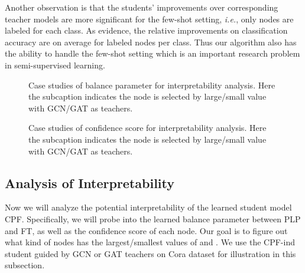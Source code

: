 \documentclass[sigconf]{acmart}
\begin{document}
Another observation is that the students' improvements over corresponding teacher models are more significant for the few-shot setting, \textit{i.e.}, only  nodes are labeled for each class. As evidence, the relative improvements on classification accuracy are  on average for  labeled nodes per class. Thus our algorithm also has the ability to handle the few-shot setting which is an important research problem in semi-supervised learning.

\begin{figure*}[ht]
\begin{minipage}[b]{\linewidth}
    \centering
\end{minipage}
\caption{Case studies of balance parameter  for interpretability analysis. Here the subcaption indicates the node is selected by large/small  value with GCN/GAT as teachers.}
\label{fig:alpha}
\end{figure*}
\begin{figure*}[ht]
\begin{minipage}[b]{\linewidth}
    \centering
\end{minipage} \caption{Case studies of confidence score  for interpretability analysis. Here the subcaption indicates the node is selected by large/small  value with GCN/GAT as teachers.}
\label{fig:confidence}
\end{figure*}
\subsection{Analysis of Interpretability}
Now we will analyze the potential interpretability of the learned student model CPF. Specifically, we will probe into the learned balance parameter  between PLP and FT, as well as the confidence score  of each node. Our goal is to figure out what kind of nodes has the largest/smallest values of  and . We use the CPF-ind student guided by GCN or GAT teachers on Cora dataset for illustration in this subsection.
\end{document}
